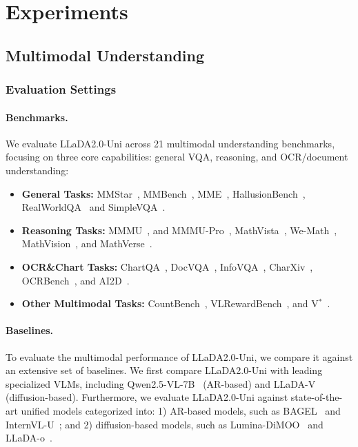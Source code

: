 \section{Experiments}
\subsection{Multimodal Understanding}
\subsubsection{Evaluation Settings}
\paragraph{Benchmarks.} We evaluate LLaDA2.0-Uni across 21 multimodal understanding benchmarks, focusing on three core capabilities: general VQA, reasoning, and OCR/document understanding:
\begin{itemize}[leftmargin=16pt]
    \item \textbf{General Tasks:}
    MMStar~\citep{mmstar}, MMBench~\citep{Mmbench}, MME~\citep{fu2023mme}, HallusionBench~\citep{Hallusionbench},  RealWorldQA~\citep{RealworldQA} and SimpleVQA~\citep{Simplevqa}.
    \item \textbf{Reasoning Tasks:} 
    MMMU~\citep{yue2024mmmu}, and MMMU-Pro~\citep{yue2025mmmupro}, MathVista~\citep{mathvista}, We-Math~\citep{We-math}, MathVision~\citep{wang2024measuring}, and MathVerse~\citep{zhang2024mathverse}.
    \item \textbf{OCR\&Chart Tasks:} 
    ChartQA~\citep{Chartqa}, DocVQA~\citep{Docvqa}, InfoVQA~\citep{InfoVQA}, CharXiv~\citep{Charxiv}, OCRBench~\citep{Ocrbench}, and AI2D~\citep{AI2D}.
    \item \textbf{Other Multimodal Tasks:}
    CountBench~\citep{countbench}, VLRewardBench~\citep{VLRewardBench}, and V$^*$~\citep{vstar}.
\end{itemize}

\paragraph{Baselines.} 
To evaluate the multimodal performance of LLaDA2.0-Uni, we compare it against an extensive set of baselines.
%
We first compare LLaDA2.0-Uni with leading specialized VLMs, including Qwen2.5-VL-7B~\citep{bai2025qwen2} (AR-based) and LLaDA-V~\citep{you2025llada} (diffusion-based).
%
Furthermore, we evaluate LLaDA2.0-Uni against state-of-the-art unified models categorized into: 1) AR-based models, such as BAGEL~\citep{bagel} and InternVL-U~\citep{tian2026internvl}; and 2) diffusion-based models, such as Lumina-DiMOO~\citep{dimoo} and LLaDA-o~\citep{you2026lladao}.

